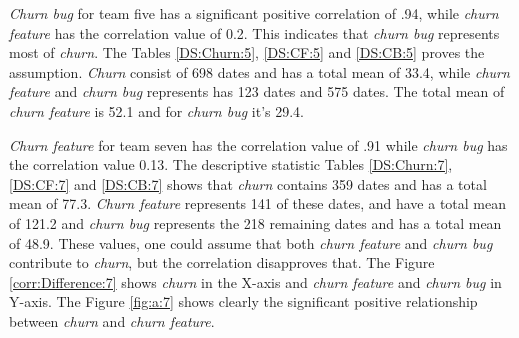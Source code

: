 \documentclass[UKenglish]{ifimaster}  %
\begin{document}
\textit{Churn bug} for team five has a significant positive correlation of .94, while \textit{churn feature} has the correlation value of 0.2. This indicates that \textit{churn bug} represents most of \textit{churn}. The Tables \ref{DS:Churn:5}, \ref{DS:CF:5} and \ref{DS:CB:5} proves the assumption. \textit{Churn} consist of 698 dates and has a total mean of 33.4, while \textit{churn feature} and \textit{churn bug} represents has 123 dates and 575 dates. The total mean of \textit{churn feature} is 52.1 and for \textit{churn bug} it's 29.4. 

\textit{Churn feature} for team seven has the correlation value of .91 while \textit{churn bug} has the correlation value 0.13. The descriptive statistic Tables \ref{DS:Churn:7}, \ref{DS:CF:7} and \ref{DS:CB:7} shows that \textit{churn} contains 359 dates and has a total mean of 77.3.  \textit{Churn feature} represents 141 of these dates, and have a total mean of 121.2 and  \textit{churn bug} represents the 218 remaining dates and has a total mean of 48.9. These values, one could assume that both  \textit{churn feature} and  \textit{churn bug} contribute to  \textit{churn}, but the correlation disapproves that. The Figure \ref{corr:Difference:7} shows \textit{churn} in the X-axis and \textit{churn feature} and \textit{churn bug} in Y-axis. The Figure \ref{fig:a:7} shows clearly the significant positive relationship between \textit{churn} and \textit{churn feature}.
\end{document}
